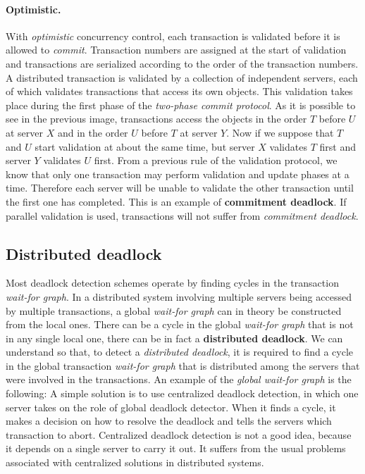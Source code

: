 \paragraph*{Optimistic.} With \textit{optimistic} concurrency control, each transaction is validated before it is allowed to \textit{commit}. Transaction numbers are assigned at the start of validation and transactions are serialized according to the order of the transaction numbers. A distributed transaction is validated by a collection of independent servers, each of which validates transactions that access its own objects. This validation takes place during the first phase of the \textit{two-phase commit protocol}.
As it is possible to see in the previous image, transactions access the objects in the order $T$ before $U$ at server $X$ and in the order $U$ before $T$ at server $Y$. Now if we suppose that $T$ and $U$ start validation at about the same time, but server $X$ validates $T$ first and server $Y$ validates $U$ first. 
From a previous rule of the validation protocol, we know that only one transaction may perform validation and update phases at a time. Therefore each server will be unable to validate the other transaction until the first one has completed. This is an example of \textbf{commitment deadlock}.
If parallel validation is used, transactions will not suffer from \textit{commitment deadlock}.

\subsection{Distributed deadlock}
Most deadlock detection schemes operate by finding cycles in the transaction \textit{wait-for graph}. In a distributed system involving multiple servers being accessed by multiple transactions, a global \textit{wait-for graph} can in theory be constructed from the local ones. There can be a cycle in the global \textit{wait-for graph} that is not in any single local one, there can be in fact a \textbf{distributed deadlock}. We can understand so that, to detect a \textit{distributed deadlock}, it is required to find a cycle in the global transaction \textit{wait-for graph} that is distributed among the servers that were involved in the transactions. An example of the \textit{global wait-for graph} is the following:
A simple solution is to use centralized deadlock detection, in which one server takes on the role of global deadlock detector. When it finds a cycle, it makes a decision on how to resolve the deadlock and tells the servers which transaction to abort. Centralized deadlock detection is not a good idea, because it depends on a single server to carry it out. It suffers from the usual problems associated with centralized solutions in distributed systems.

